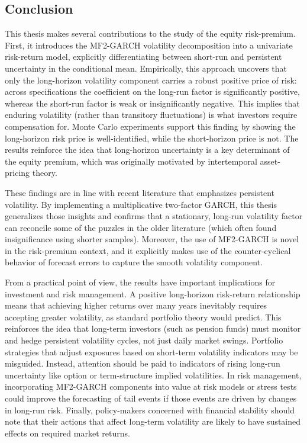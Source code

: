 \documentclass[12pt]{article}
\begin{document}
\subsection{Conclusion}
This thesis makes several contributions to the study of the equity risk-premium. First, it introduces the MF2-GARCH volatility decomposition into a univariate risk-return model, explicitly differentiating between short-run and persistent uncertainty in the conditional mean. Empirically, this approach uncovers that only the long-horizon volatility component carries a robust positive price of risk: across specifications the coefficient on the long-run factor is significantly positive, whereas the short-run factor is weak or insignificantly negative. This implies that enduring volatility (rather than transitory fluctuations) is what investors require compensation for. Monte Carlo experiments support this finding by showing the long-horizon risk price is well-identified, while the short-horizon price is not. The results reinforce the idea that long-horizon uncertainty is a key determinant of the equity premium, which was originally motivated by intertemporal asset-pricing theory.\par
These findings are in line with recent literature that emphasizes persistent volatility. By implementing a multiplicative two-factor GARCH, this thesis generalizes those insights and confirms that a stationary, long-run volatility factor can reconcile some of the puzzles in the older literature (which often found insignificance using shorter samples). Moreover, the use of MF2-GARCH is novel in the risk-premium context, and it explicitly makes use of the counter-cyclical behavior of forecast errors to capture the smooth volatility component.\par
From a practical point of view, the results have important implications for investment and risk management. A positive long-horizon risk-return relationship means that achieving higher returns over many years inevitably requires accepting greater volatility, as standard portfolio theory would predict. This reinforces the idea that long-term investors (such as pension funds) must monitor and hedge persistent volatility cycles, not just daily market swings. Portfolio strategies that adjust exposures based on short-term volatility indicators may be misguided. Instead, attention should be paid to indicators of rising long-run uncertainty like option or term-structure implied volatilities. In risk management, incorporating MF2-GARCH components into value at risk models or stress tests could improve the forecasting of tail events if those events are driven by changes in long-run risk. Finally, policy-makers concerned with financial stability should note that their actions that affect long-term volatility are likely to have sustained effects on required market returns.\par
\end{document}
